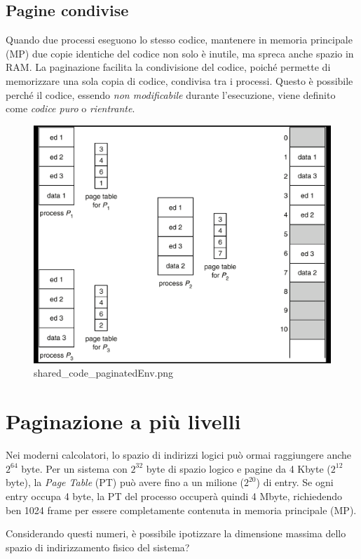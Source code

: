 \subsection{Pagine condivise}
Quando due processi eseguono lo stesso codice, mantenere in memoria principale (MP) due copie identiche del codice non solo è inutile, ma spreca anche spazio in RAM. La paginazione facilita la condivisione del codice, poiché permette di memorizzare una sola copia di codice, condivisa tra i processi. Questo è possibile perché il codice, essendo \emph{non modificabile} durante l'esecuzione, viene definito come \emph{codice puro} o \emph{rientrante}.


\begin{figure}[h] \centering \includegraphics[width=0.45\linewidth]{images/shared_code_paginatedEnv.png} \caption{shared_code_paginatedEnv.png} \label{fig:9.9} \end{figure}

\section{Paginazione a più livelli}

Nei moderni calcolatori, lo spazio di indirizzi logici può ormai raggiungere anche \(2^{64}\) byte. Per un sistema con \(2^{32}\) byte di spazio logico e pagine da 4 Kbyte (\(2^{12}\) byte), la \emph{Page Table} (PT) può avere fino a un milione (\(2^{20}\)) di entry. Se ogni entry occupa 4 byte, la PT del processo occuperà quindi 4 Mbyte, richiedendo ben 1024 frame per essere completamente contenuta in memoria principale (MP).

\qs{} {
Considerando questi numeri, è possibile ipotizzare la dimensione massima dello spazio di indirizzamento fisico del sistema?
}

